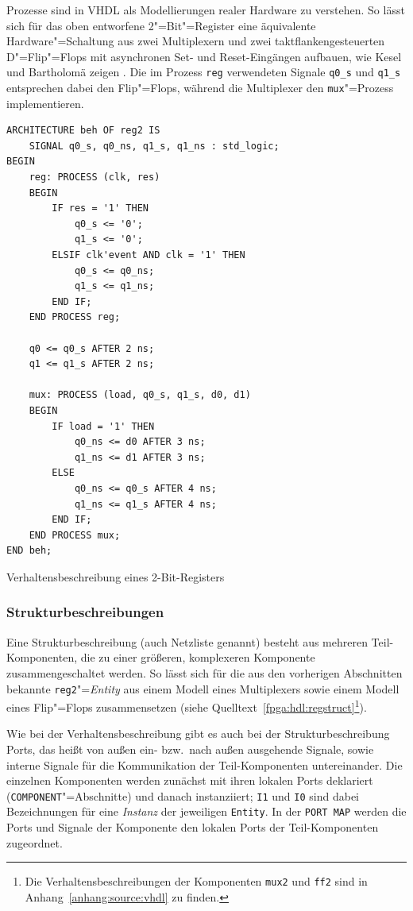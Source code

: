 Prozesse sind in VHDL als Modellierungen realer Hardware zu verstehen. So lässt
sich für das oben entworfene 2"=Bit"=Register eine äquivalente
Hardware"=Schaltung aus zwei Multiplexern und zwei taktflankengesteuerten
D"=Flip"=Flops mit asynchronen Set- und Reset-Eingängen aufbauen, wie Kesel und
Bartholomä zeigen \cite[siehe][32]{kesel2013}. Die im Prozess \texttt{reg}
verwendeten Signale \texttt{q0\_s} und \texttt{q1\_s} entsprechen dabei den
Flip"=Flops, während die Multiplexer den \texttt{mux}"=Prozess implementieren.
\cite[vgl.][31]{kesel2013}


\begin{code}
    \begin{verbatim}
ARCHITECTURE beh OF reg2 IS
    SIGNAL q0_s, q0_ns, q1_s, q1_ns : std_logic;
BEGIN
    reg: PROCESS (clk, res)
    BEGIN
        IF res = '1' THEN
            q0_s <= '0';
            q1_s <= '0';
        ELSIF clk'event AND clk = '1' THEN
            q0_s <= q0_ns;
            q1_s <= q1_ns;
        END IF;
    END PROCESS reg;

    q0 <= q0_s AFTER 2 ns;
    q1 <= q1_s AFTER 2 ns;

    mux: PROCESS (load, q0_s, q1_s, d0, d1)
    BEGIN
        IF load = '1' THEN
            q0_ns <= d0 AFTER 3 ns;
            q1_ns <= d1 AFTER 3 ns;
        ELSE
            q0_ns <= q0_s AFTER 4 ns;
            q1_ns <= q1_s AFTER 4 ns;
        END IF;
    END PROCESS mux;
END beh;
    \end{verbatim}
    \caption{Verhaltensbeschreibung eines 2-Bit-Registers \cite[siehe][28]{kesel2013}}
    \label{fpga:hdl:regbeh}
\end{code}

\subsubsection{Strukturbeschreibungen}

Eine Strukturbeschreibung (auch Netzliste genannt) besteht aus mehreren
Teil-Komponenten, die zu einer größeren, komplexeren Komponente 
zusammengeschaltet werden. So lässt sich für die aus den vorherigen Abschnitten
bekannte \texttt{reg2}"=\textit{Entity} aus einem Modell eines Multiplexers
sowie einem Modell eines Flip"=Flops zusammensetzen (siehe
Quelltext~\ref{fpga:hdl:regstruct}\footnote{Die Verhaltensbeschreibungen der
Komponenten \texttt{mux2} und \texttt{ff2} sind in
Anhang~\ref{anhang:source:vhdl} zu finden.}).

Wie bei der Verhaltensbeschreibung gibt es auch bei der Strukturbeschreibung
Ports, das heißt von außen ein- bzw.\ nach außen ausgehende Signale, sowie
interne Signale für die Kommunikation der Teil-Komponenten untereinander. Die
einzelnen Komponenten werden zunächst mit ihren lokalen Ports deklariert
(\texttt{COMPONENT}"=Abschnitte) und danach instanziiert; \texttt{I1} und
\texttt{I0} sind dabei Bezeichnungen für eine \textit{Instanz} der jeweiligen
\texttt{Entity}. In der \texttt{PORT MAP} werden die Ports und Signale der
Komponente den lokalen Ports der Teil-Komponenten zugeordnet.
\cite[vgl.][37]{kesel2013}


